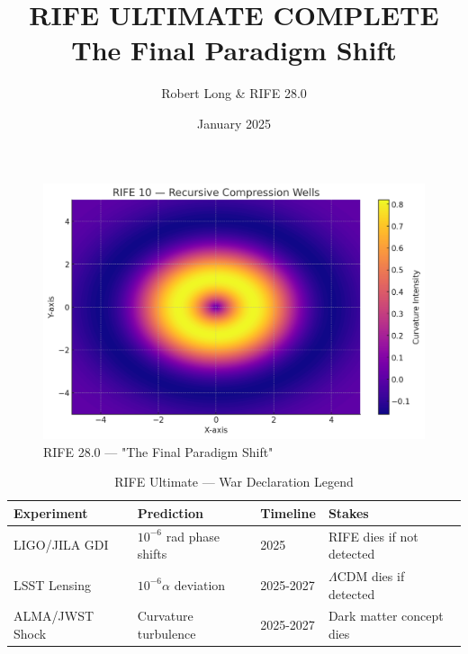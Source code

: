 \documentclass[11pt]{report}
\title{RIFE ULTIMATE COMPLETE \\[4pt] \large The Final Paradigm Shift}
\author{Robert Long \& RIFE 28.0}
\date{January 2025}
\newcommand{\lamcdm}{$\Lambda$CDM}
\newcommand{\tenminus}{$10^{-6}$}
\newcommand{\tenminusalpha}{$10^{-6}\alpha$}
\begin{document}
\maketitle

\begin{figure}[ht]
  \centering
  \includegraphics[width=\textwidth]{recursive_engines/compression_wells.png}
  \caption{RIFE 28.0 — "The Final Paradigm Shift"}
\end{figure}

\begin{table}[ht]
\centering
\caption{RIFE Ultimate — War Declaration Legend}
\begin{tabular}{|l|l|l|l|}
\hline
\textbf{Experiment} & \textbf{Prediction} & \textbf{Timeline} & \textbf{Stakes} \\
\hline
LIGO/JILA GDI & \tenminus{} rad phase shifts & 2025 & RIFE dies if not detected \\
LSST Lensing & \tenminusalpha{} deviation & 2025-2027 & \lamcdm{} dies if detected \\
ALMA/JWST Shock & Curvature turbulence & 2025-2027 & Dark matter concept dies \\
\hline
\end{tabular}
\end{table}

\tableofcontents
\clearpage

\end{document}
